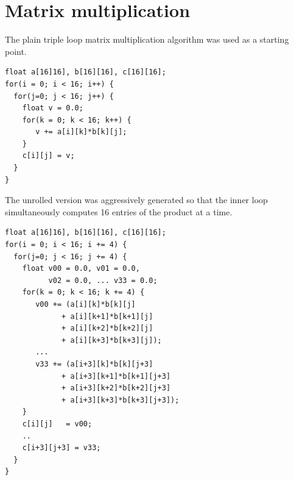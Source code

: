 \documentclass[conference]{IEEEtran}
\begin{document}
\section{Matrix multiplication}

The plain triple loop matrix multiplication algorithm was
used as a starting point.
\begin{verbatim}
float a[16]16], b[16][16], c[16][16];
for(i = 0; i < 16; i++) {
  for(j=0; j < 16; j++) {
    float v = 0.0;
    for(k = 0; k < 16; k++) {
       v += a[i][k]*b[k][j];
    }
    c[i][j] = v;
  }
}
\end{verbatim}
The unrolled version was aggressively generated so that
the inner loop simultaneously computes 16 entries of the
product at a time.
\begin{verbatim}
float a[16]16], b[16][16], c[16][16];
for(i = 0; i < 16; i += 4) {
  for(j=0; j < 16; j += 4) {
    float v00 = 0.0, v01 = 0.0,
          v02 = 0.0, ... v33 = 0.0;
    for(k = 0; k < 16; k += 4) {
       v00 += (a[i][k]*b[k][j] 
             + a[i][k+1]*b[k+1][j]
             + a[i][k+2]*b[k+2][j]
             + a[i][k+3]*b[k+3][j]);
       ...
       v33 += (a[i+3][k]*b[k][j+3] 
             + a[i+3][k+1]*b[k+1][j+3]
             + a[i+3][k+2]*b[k+2][j+3]
             + a[i+3][k+3]*b[k+3][j+3]);
    }
    c[i][j]   = v00;
    ..
    c[i+3][j+3] = v33;
  }
}
\end{verbatim}
\end{document}
